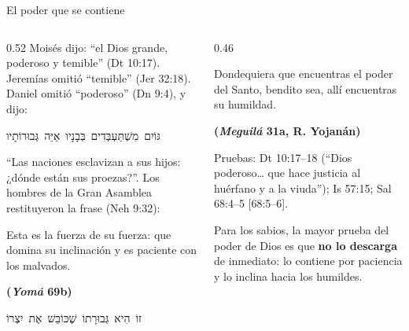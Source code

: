 \documentclass[hyperref={bookmarks=false},aspectratio=169]{beamer}
\newcommand{\heb}[1]{\mbox{\foreignlanguage{hebrew}{#1}}}
\newcommand{\fuente}[1]{\par\hfill{\upshape\bfseries\footnotesize\textcolor{azul}{#1}}}
\newcommand{\destacar}[1]{\textbf{\textcolor{azul}{#1}}}
\begin{document}
\begin{frame}{El poder que se contiene}
\begin{columns}[t,onlytextwidth]
\begin{column}{0.52\textwidth}\scriptsize
Moisés dijo: ``el Dios grande, poderoso y temible'' (Dt 10:17). Jeremías omitió ``temible'' (Jer 32:18). Daniel omitió ``poderoso'' (Dn 9:4), y dijo:
\begin{center}\heb{גּוֹיִם מִשְׁתַּעְבְּדִים בְּבָנָיו אַיֵּה גְּבוּרוֹתָיו}\end{center}
``Las naciones esclavizan a sus hijos: ¿dónde están sus proezas?''. Los hombres de la Gran Asamblea restituyeron la frase (Neh 9:32):
\begin{cita}[colback=dorado!10!papiro,colframe=dorado!80!azul,fontupper=\scriptsize\itshape]Esta es la fuerza de su fuerza: que domina su inclinación y es paciente con los malvados.\fuente{(\emph{Yomá} 69b)}\end{cita}
\begin{center}\heb{זוֹ הִיא גְּבוּרָתוֹ שֶׁכּוֹבֵשׁ אֶת יִצְרוֹ}\end{center}
\end{column}
\begin{column}{0.46\textwidth}\small
\begin{cita}[colback=dorado!10!papiro,colframe=dorado!80!azul,fontupper=\scriptsize\itshape]Dondequiera que encuentras el poder del Santo, bendito sea, allí encuentras su humildad.\fuente{(\emph{Meguilá} 31a, R. Yojanán)}\end{cita}
\scriptsize Pruebas: Dt 10:17--18 (``Dios poderoso\ldots{} que hace justicia al huérfano y a la viuda''); Is 57:15; Sal 68:4--5 [68:5--6].\par\medskip
\small Para los sabios, la mayor prueba del poder de Dios es que \destacar{no lo descarga} de inmediato: lo contiene por paciencia y lo inclina hacia los humildes.
\end{column}
\end{columns}
\end{frame}
\end{document}
